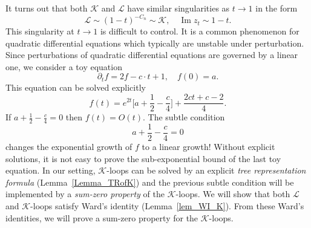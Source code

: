\documentclass[10pt,reqno]{article}
\DeclareMathOperator{\im}{{\mathrm{Im}}}
\theoremstyle{plain} %
\theoremstyle{remark}
\numberwithin{equation}{section}
\begin{document}
It turns out  that both $\mathcal K$ and $\mathcal L$ have similar singularities as $t \to 1$ in the form 
\[
\mathcal{L}  \sim 
\left( 1-t \right)^{-C_n} \sim {\mathcal K },    \quad \im z_t \sim 1-t.
\]
This singularity  at $t \to 1$ is  difficult to control.  It  is a common phenomenon for  quadratic differential equations which  typically  are  unstable under perturbation. Since perturbations of  quadratic differential equations are governed by a linear one, we consider a toy  equation
\[
\partial_t f = 2f - c \cdot t + 1, \quad f(0) = a.
\]
This equation can be solved  explicitly 
\[
f(t)= e^{2 t} \big [a  + \frac 1 2    - \frac c 4    \big ] + \frac  { 2 ct + c-2}  4.
\]
If $a  + \frac 1 2    -  \frac c 4   =0$  then \( f(t) = O(t) \).  The subtle condition 
\[
a  + \frac 1 2    -  \frac c 4   =0
\]
changes the exponential growth of $f$ to a linear growth!  Without explicit solutions, it is not easy to prove the sub-exponential bound of the last toy equation. In our setting,   \(\mathcal{K}\)-loops can be solved by an explicit  \emph{tree representation  formula} (Lemma~\ref{Lemma_TRofK}) and  the previous subtle condition will be implemented by a \emph{sum-zero property} of the \(\mathcal{K}\)-loops.   We will show that both \(\mathcal{L}\) and  \(\mathcal{K}\)-loops satisfy   Ward's identity  (Lemma~\ref{lem_WI_K}). From these  Ward's identities, 
we will prove a {sum-zero property} for the \(\mathcal{K}\)-loops. 
\end{document}
